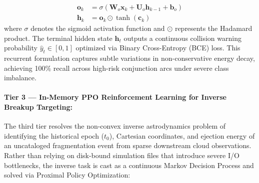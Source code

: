 \begin{enumerate}
\begin{align}
    \mathbf{o}_k &= \sigma(\mathbf{W}_o \mathbf{x}_k + \mathbf{U}_o \mathbf{h}_{k-1} + \mathbf{b}_o) \label{eq:lstm_o} \\
    \mathbf{h}_k &= \mathbf{o}_k \odot \tanh(\mathbf{c}_k) \label{eq:lstm_h}
    \end{align}
    where $\sigma$ denotes the sigmoid activation function and $\odot$ represents the Hadamard product. The terminal hidden state $\mathbf{h}_t$ outputs a continuous collision warning probability $\hat{y}_t \in [0, 1]$ optimized via Binary Cross-Entropy (BCE) loss. This recurrent formulation captures subtle variations in non-conservative energy decay, achieving 100\% recall across high-risk conjunction arcs under severe class imbalance.
\end{enumerate}

\paragraph{Tier 3 --- In-Memory PPO Reinforcement Learning for Inverse Breakup Targeting:}
The third tier resolves the non-convex inverse astrodynamics problem of identifying the historical epoch ($t_0$), Cartesian coordinates, and ejection energy of an uncataloged fragmentation event from sparse downstream cloud observations. Rather than relying on disk-bound simulation files that introduce severe I/O bottlenecks, the inverse task is cast as a continuous Markov Decision Process and solved via Proximal Policy Optimization:
